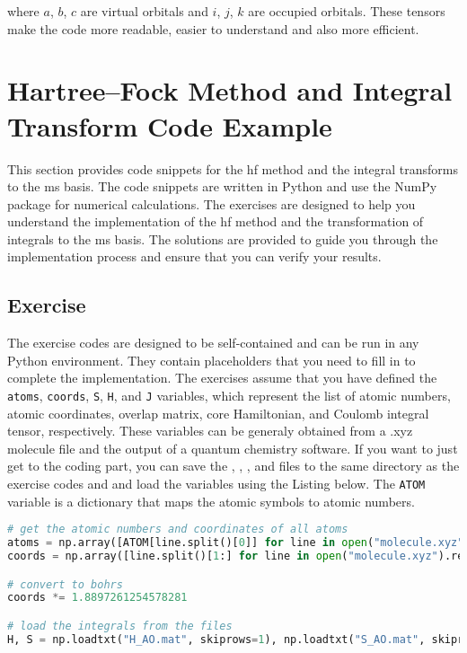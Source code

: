 where \(a\), \(b\), \(c\) are virtual orbitals and \(i\), \(j\), \(k\) are occupied orbitals. These tensors make the code more readable, easier to understand and also more efficient.

\section{\texorpdfstring{Hartree--Fock Method and Integral Transform Code Example\label{sec:hf_code_examples}}{Hartree--Fock Method and Integral Transform Code Example}}

This section provides code snippets for the \acrshort{hf} method and the integral transforms to the \acrshort{ms} basis. The code snippets are written in Python and use the NumPy package for numerical calculations. The exercises are designed to help you understand the implementation of the \acrshort{hf} method and the transformation of integrals to the \acrshort{ms} basis. The solutions are provided to guide you through the implementation process and ensure that you can verify your results.

\subsection{Exercise}

The exercise codes are designed to be self-contained and can be run in any Python environment. They contain placeholders that you need to fill in to complete the implementation. The exercises assume that you have defined the \texttt{\lstinline!atoms!}, \texttt{\lstinline!coords!}, \texttt{\lstinline!S!}, \texttt{\lstinline!H!}, and \texttt{\lstinline!J!} variables, which represent the list of atomic numbers, atomic coordinates, overlap matrix, core Hamiltonian, and Coulomb integral tensor, respectively. These variables can be generaly obtained from a .xyz molecule file and the output of a quantum chemistry software. If you want to just get to the coding part, you can save the , , , and  files to the same directory as the exercise codes and and load the variables using the Listing below. The \texttt{\lstinline!ATOM!} variable is a dictionary that maps the atomic symbols to atomic numbers.

\lstset{style=mystyle}
\raggedbottom\begin{lstlisting}[language=Python]
# get the atomic numbers and coordinates of all atoms
atoms = np.array([ATOM[line.split()[0]] for line in open("molecule.xyz").readlines()[2:]], dtype=int)
coords = np.array([line.split()[1:] for line in open("molecule.xyz").readlines()[2:]], dtype=float)

# convert to bohrs
coords *= 1.8897261254578281

# load the integrals from the files
H, S = np.loadtxt("H_AO.mat", skiprows=1), np.loadtxt("S_AO.mat", skiprows=1); J = np.loadtxt("J_AO.mat", skiprows=1).reshape(4 * [S.shape[1]])
\end{lstlisting}

